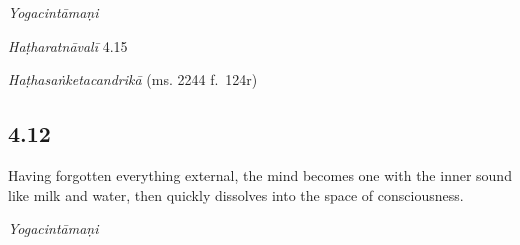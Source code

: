 \begin{ekdosis}

\begin{testimonia}[hp04_011]
\emph{Yogacintāmaṇi}
\begin{versinnote}
\end{versinnote}

\emph{Haṭharatnāvalī} 4.15
\begin{versinnote}
\end{versinnote}

\emph{Haṭhasaṅketacandrikā} (ms. 2244 f.~124r)
\begin{versinnote}
\end{versinnote}
\end{testimonia}


\subsection*{4.12}
\begin{translation}[hp04_012]
Having forgotten everything external, the mind becomes one with the inner sound like milk and water, then quickly dissolves into the space of consciousness.
\end{translation}


\begin{testimonia}[hp04_012]
\emph{Yogacintāmaṇi}
\begin{versinnote}
\end{versinnote}


\end{testimonia}
\end{ekdosis}
